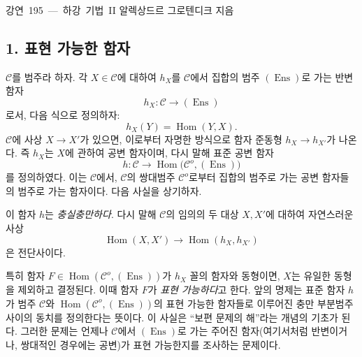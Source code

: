 \unit{강연 195 — 하강 기법 II}
%
  {알렉상드르 그로텐디크 지음}


\subsection*{1. 표현 가능한 함자}

$\mathcal C$를 범주라 하자. 각 $X\in\mathcal C$에 대하여 $h_X$를
$\mathcal C$에서 집합의 범주 $(\operatorname{Ens})$로 가는 반변 함자
\[
  h_X:\mathcal C\longrightarrow(\operatorname{Ens})
\]
로서, 다음 식으로 정의하자:
\[
  h_X(Y)=\operatorname{Hom}(Y,X).
\]
$\mathcal C$에 사상 $X\longrightarrow X'$가 있으면, 이로부터 자명한
방식으로 함자 준동형 $h_X\longrightarrow h_{X'}$가 나온다. 즉 $h_X$는
$X$에 관하여 공변 함자이며, 다시 말해 표준 공변 함자
\[
  h:\mathcal C\longrightarrow
  \operatorname{Hom}\bigl(\mathcal C^o,(\operatorname{Ens})\bigr)
\]
를 정의하였다. 이는 $\mathcal C$에서, $\mathcal C$의 쌍대범주
$\mathcal C^o$로부터 집합의 범주로 가는 공변 함자들의 범주로 가는
함자이다. 다음 사실을 상기하자.

 이 함자 $h$는 \emph{충실충만하다}. 다시 말해
$\mathcal C$의 임의의 두 대상 $X,X'$에 대하여 자연스러운 사상
\[
  \operatorname{Hom}(X,X')\longrightarrow
  \operatorname{Hom}(h_X,h_{X'})
\]
은 전단사이다.

특히 함자 $F\in\operatorname{Hom}(\mathcal C^o,(\operatorname{Ens}))$가
$h_X$ 꼴의 함자와 동형이면, $X$는 유일한 동형을 제외하고 결정된다.
이때 함자 $F$가 \emph{표현 가능하다}고 한다. 앞의 명제는 표준 함자 $h$가
범주 $\mathcal C$와
$\operatorname{Hom}(\mathcal C^o,(\operatorname{Ens}))$의 표현 가능한
함자들로 이루어진 충만 부분범주 사이의 동치를 정의한다는 뜻이다. 이
사실은 ``보편 문제의 해''라는 개념의 기초가 된다. 그러한 문제는 언제나
$\mathcal C$에서 $(\operatorname{Ens})$로 가는 주어진 함자(여기서처럼
반변이거나, 쌍대적인 경우에는 공변)가 표현 가능한지를 조사하는 문제이다.

